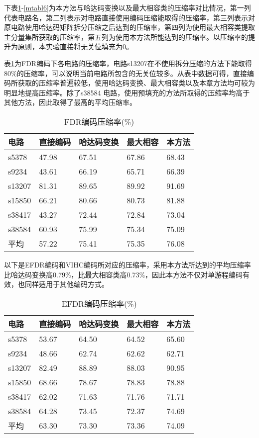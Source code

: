 下表\ref{mtabl2}-\ref{mtabl6}为本方法与哈达码变换以及最大相容类的压缩率对比情况，第一列代表电路名，第二列表示对电路直接使用编码压缩能取得的压缩率，第三列表示对原电路使用哈达码矩阵拆分压缩之后达到的压缩率，第四列为使用最大相容类提取主分量集所获取的压缩率，第五列为使用本方法所能达到的压缩率。以压缩率的提升为原则，本实验直接将无关位填充为0。

表\ref{mtabl2}为FDR编码下各电路的压缩率，电路s13207在不使用拆分压缩的方法下能取得80\%的压缩率，可以说明当前电路所包含的无关位较多。从表中数据可得，直接编码所获取的压缩率普遍较低，使用哈达码变换、最大相容类以及本章方法均可较为明显地提高压缩率。除了s38584 电路，使用预填充的方法所取得的压缩率均高于其他方法，因此取得了最高的平均压缩率。

\begin{table}[H]
\centering
\caption{FDR编码压缩率(\%)}\label{mtabl2}
\begin{tabular}{p{2.2cm}p{2.7cm}<{\centering}p{3.3cm}<{\centering}p{2.7cm}<{\centering}p{2.7cm}<{\centering}}
\toprule
\textbf{电路}&	\textbf{直接编码}& \textbf{哈达码变换}& \textbf{最大相容}& \textbf{本方法}\\
\midrule
s5378&	47.98&	67.51&	67.86&	68.43\\
s9234&	43.61&	66.19&	65.71&	66.39\\
s13207&	81.31&	89.65&	89.92&	91.69\\
s15850&	66.21&	80.66&	80.73&	81.88\\
s38417&	43.27&	72.44&	72.84&	73.04\\
s38584&	60.93&	75.99&	75.34&	75.09\\
平均&	57.22&	75.41&	75.35&	76.08\\
\bottomrule
\end{tabular}
\end{table}

以下是EFDR编码和VIHC编码所对应的压缩率，采用本方法所达到的平均压缩率比哈达码变换高0.79\%，比最大相容类高0.73\%，因此本方法不仅对单游程编码有效，也同样适用于其他编码方式。

\begin{table}[H]
\centering
\caption{EFDR编码压缩率(\%)}\label{mtabl3}
\begin{tabular}{p{2.2cm}p{2.7cm}<{\centering}p{3.3cm}<{\centering}p{2.7cm}<{\centering}p{2.7cm}<{\centering}}
\toprule
\textbf{电路}&	\textbf{直接编码}& \textbf{哈达码变换}& \textbf{最大相容}& \textbf{本方法}\\
\midrule
s5378&	53.67&	64.50&	64.52&	65.60\\
s9234&	48.66&	62.74&	62.62&	62.71\\
s13207&	82.49&	88.89&	88.03&	90.95\\
s15850&	68.66&	78.67&	78.83&	78.88\\
s38417&	62.02&	71.63&	71.76&	71.71\\
s38584&	64.28&	73.45&	72.37&	74.69\\
平均&	63.30&	73.30&	73.36&	74.09\\
\bottomrule
\end{tabular}
\end{table}


